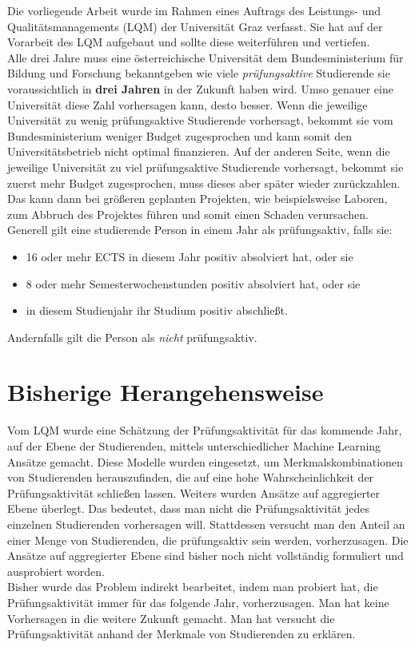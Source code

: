 


Die vorliegende Arbeit wurde im Rahmen eines Auftrags des Leistungs- und Qualit\"atsmanagements (LQM) der
Universität Graz verfasst. Sie hat auf der Vorarbeit des LQM aufgebaut und sollte diese weiterf\"uhren 
und vertiefen. \\

Alle drei Jahre muss eine \"osterreichische Universität dem Bundesministerium f\"ur Bildung und Forschung
bekanntgeben wie viele \textit{pr\"ufungsaktive} Studierende sie voraussichtlich in \textbf{drei Jahren} 
in der Zukunft haben wird. Umso genauer eine Universität diese Zahl vorhersagen kann, desto besser.
Wenn die jeweilige Universität zu wenig pr\"ufungsaktive Studierende vorhersagt, bekommt sie vom Bundesministerium
weniger Budget zugesprochen und kann somit den Universitätsbetrieb nicht optimal finanzieren. Auf der anderen Seite,
wenn die jeweilige Universität zu viel pr\"ufungsaktive Studierende vorhersagt, bekommt sie zuerst mehr Budget zugesprochen,
muss dieses aber sp\"ater wieder zur\"uckzahlen. Das kann dann bei gr\"o{\ss}eren geplanten Projekten, wie beispielsweise Laboren,
zum Abbruch des Projektes f\"uhren und somit einen Schaden verursachen. \\

\noindent Generell gilt eine studierende Person in einem Jahr als pr\"ufungsaktiv, falls sie:

\begin{itemize}
    \item 16 oder mehr ECTS in diesem Jahr positiv absolviert hat, oder sie
    \item 8 oder mehr Semesterwochenstunden positiv absolviert hat, oder sie
    \item in diesem Studienjahr ihr Studium positiv abschlie{\ss}t.
\end{itemize}
Andernfalls gilt die Person als \textit{nicht} pr\"ufungsaktiv. \\





\section{Bisherige Herangehensweise}


Vom LQM wurde eine Sch\"atzung der Pr\"ufungsaktivit\"at f\"ur das kommende Jahr, auf der Ebene der Studierenden,
mittels unterschiedlicher Machine Learning Ans\"atze gemacht. Diese Modelle wurden eingesetzt, um Merkmalskombinationen von Studierenden herauszufinden, 
die auf eine hohe Wahrscheinlichkeit der Pr\"ufungsaktivit\"at schlie{\ss}en lassen.
Weiters wurden Ans\"atze auf aggregierter Ebene \"uberlegt. Das bedeutet, dass man nicht die Pr\"ufungsaktivit\"at jedes einzelnen Studierenden vorhersagen will. Stattdessen
versucht man den Anteil an einer Menge von Studierenden, die pr\"ufungsaktiv sein werden, vorherzusagen. 
Die Ans\"atze auf aggregierter Ebene sind bisher noch nicht vollst\"andig formuliert und ausprobiert worden. \\


Bisher wurde das Problem indirekt bearbeitet, indem man probiert hat, die Pr\"ufungsaktivit\"at
immer f\"ur das folgende Jahr, vorherzusagen. Man hat keine Vorhersagen in die weitere Zukunft gemacht.
Man hat versucht die Pr\"ufungsaktivit\"at anhand der Merkmale von Studierenden zu erkl\"aren. \\

